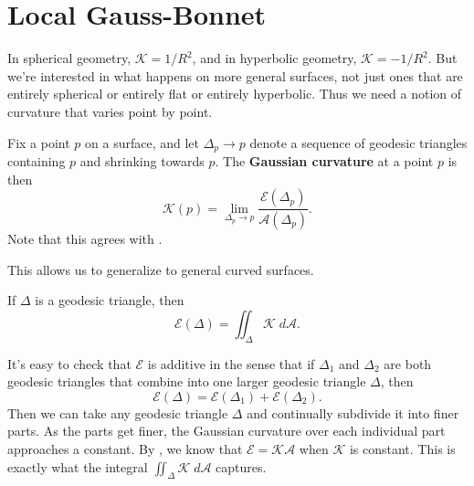 \documentclass[twoside,10pt]{report}
\begin{document}
\section{Local Gauss-Bonnet}

In spherical geometry, $\mathcal{K} = 1/R^2$, and in hyperbolic geometry, $\mathcal{K} = -1/R^2$. But we're interested in what happens on more general surfaces, not just ones that are entirely spherical or entirely flat or entirely hyperbolic. Thus we need a notion of curvature that varies point by point.

\begin{defn}[]
	Fix a point $p$ on a surface, and let $\Delta_{p}\to p$ denote a sequence of geodesic triangles containing $p$ and shrinking towards $p$. The \textbf{Gaussian curvature} at a point $p$ is then
	\[
	\mathcal{K}(p) = \lim_{\Delta_{p} \to p} \frac{\mathcal{E}(\Delta_{p})}{\mathcal{A}(\Delta_{p})} .
	\] 
	Note that this agrees with .
\end{defn}
This allows us to generalize  to general curved surfaces.
\begin{thrm}
	\label{GB-local}
	If $\Delta$ is a geodesic triangle, then
	\[
	\mathcal{E}(\Delta) = \iint_{\Delta} \mathcal{K}\;d\mathcal{A}.
	\] 
\end{thrm}
It's easy to check that $\mathcal{E}$ is additive in the sense that if $\Delta_1 $ and $\Delta_2$ are both geodesic triangles that combine into one larger geodesic triangle $\Delta$, then
\[
\mathcal{E}(\Delta) = \mathcal{E}(\Delta_1) + \mathcal{E}(\Delta_2).
\] 
Then we can take any geodesic triangle $\Delta$ and continually subdivide it into finer parts. As the parts get finer, the Gaussian curvature over each individual part approaches a constant. By , we know that $\mathcal{E} = \mathcal{K} \mathcal{A}$ when $\mathcal{K}$ is constant. This is exactly what the integral $\iint_{\Delta} \mathcal{K}\;d\mathcal{A}$ captures.
\end{document}
